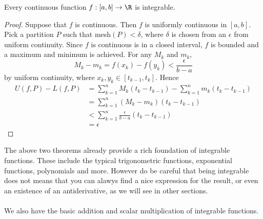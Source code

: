 \begin{thm}{}{} Every continuous function $f:[a,b]\to\R$ is integrable. \tcbline
\begin{proof} Suppose that $f$ is continuous. Then $f$ is uniformly continuous in $[a,b]$. Pick a partition $P$ such that mesh$(P)<\delta$, where $\delta$ is chosen from an $\epsilon$ from uniform continuity. Since $f$ is continuous is in a closed interval, $f$ is bounded and a maximum and minimum is achieved. For any $M_k$ and $m_k$, $$M_k-m_k=f(x_k)-f(y_k)<\frac{\epsilon}{b-a}$$ by uniform continuity, where $x_k,y_k\in[t_{k-1},t_k]$. Hence 
\begin{align*}
U(f,P)-L(f,P)&=\sum_{k=1}^nM_k(t_k-t_{k-1})-\sum_{k=1}^nm_k(t_k-t_{k-1})\\
&=\sum_{k=1}^n(M_k-m_k)(t_k-t_{k-1})\\
&<\sum_{k=1}^n\frac{\epsilon}{b-a}(t_k-t_{k-1})\\
&=\epsilon
\end{align*}
\end{proof}
\end{thm}

The above two theorems already provide a rich foundation of integrable functions. These include the typical trigonometric functions, exponential functions, polynomials and more. However do be careful that being integrable does not means that you can alawys find a nice expression for the result, or even an existence of an antiderivative, as we will see in other sections. \\~\\
We also have the basic addition and scalar multiplication of integrable functions. 

